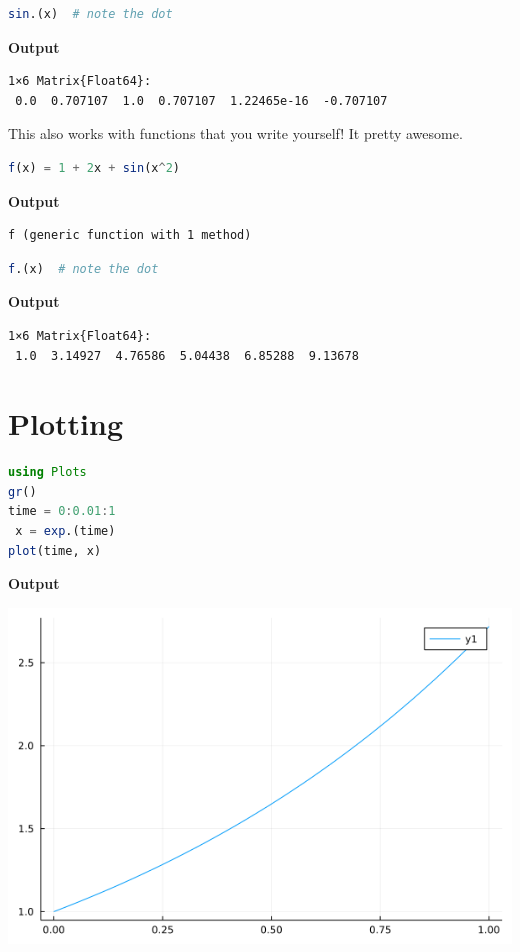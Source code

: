 \begin{lstlisting}[language=Julia,style=mystyle]
sin.(x)  # note the dot
\end{lstlisting}
\textbf{Output} 
\begin{verbatim}
1×6 Matrix{Float64}:
 0.0  0.707107  1.0  0.707107  1.22465e-16  -0.707107
\end{verbatim}

This also works with functions that you write yourself! It pretty awesome.

\begin{lstlisting}[language=Julia,style=mystyle]
f(x) = 1 + 2x + sin(x^2)
\end{lstlisting}
\textbf{Output} 
\begin{verbatim}
f (generic function with 1 method)
\end{verbatim}

\begin{lstlisting}[language=Julia,style=mystyle]
f.(x)  # note the dot
\end{lstlisting}
\textbf{Output} 
\begin{verbatim}
1×6 Matrix{Float64}:
 1.0  3.14927  4.76586  5.04438  6.85288  9.13678
\end{verbatim}



\section{Plotting}


\begin{lstlisting}[language=Julia,style=mystyle]
using Plots
gr()
time = 0:0.01:1
 x = exp.(time)
plot(time, x)
\end{lstlisting}
\textbf{Output} 
	\begin{center}
\includegraphics[width=0.5\columnwidth]{graphics/AppA/AppendixA_SimplePlot.png}
\end{center}


